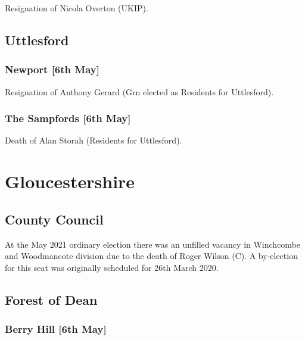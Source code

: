 \documentclass[a4paper,openany]{book}
\begin{document}
\begin{resultsiii}
Resignation of Nicola Overton (UKIP).

\subsection*{Uttlesford}

\subsubsection*{Newport \hspace*{\fill}\nolinebreak[1]%
	\enspace\hspace*{\fill}
	[6th May]}


Resignation of Anthony Gerard (Grn elected as Residents for Uttlesford).

\subsubsection*{The Sampfords \hspace*{\fill}\nolinebreak[1]%
	\enspace\hspace*{\fill}
	[6th May]}


Death of Alan Storah (Residents for Uttlesford).

\section{Gloucestershire}

\subsection*{County Council}

At the May 2021 ordinary election there was an unfilled vacancy in Winchcombe and Woodmancote division due to the death of Roger Wilson (C).  A by-election for this seat was originally scheduled for 26th March 2020.

\subsection*{Forest of Dean}

\subsubsection*{Berry Hill \hspace*{\fill}\nolinebreak[1]%
	\enspace\hspace*{\fill}
	[6th May]}


\end{resultsiii}
\end{document}
